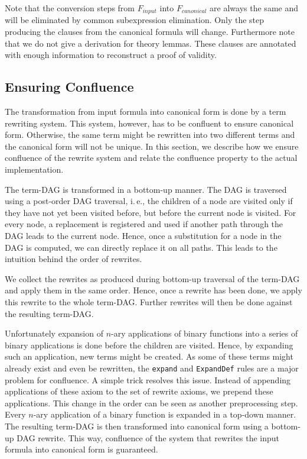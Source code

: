 \documentclass[a4paper]{article}
\begin{document}
Note that the conversion steps from $F_{input}$ into $F_{canonical}$ are always
the same and will be eliminated by common subexpression elimination.  Only the
step producing the clauses from the canonical formula will change.
Furthermore note that we do not give a derivation for theory lemmas.
These clauses are annotated with enough information to reconstruct a proof of
validity.

\subsection{Ensuring Confluence}
The transformation from input formula into canonical form is done by a term
rewriting system.  This system, however, has to be confluent to ensure
canonical form.  Otherwise, the same term might be rewritten into two
different terms and the canonical form will not be unique.  In this section, we
describe how we ensure confluence of the rewrite system and relate the
confluence property to the actual implementation.

The term-DAG is transformed in a bottom-up manner.  The DAG is traversed using
a post-order DAG traversal, i.\,e., the children of a node are visited only if
they have not yet been visited before, but before the current node is visited.
For every node, a replacement is registered and used if another path through
the DAG leads to the current node.  Hence, once a substitution for a node in
the DAG is computed, we can directly replace it on all paths.  This leads to
the intuition behind the order of rewrites.

We collect the rewrites as produced during bottom-up traversal of the term-DAG
and apply them in the same order.  Hence, once a rewrite has been done, we
apply this rewrite to the whole term-DAG.  Further rewrites will then be done
against the resulting term-DAG.

Unfortunately expansion of $n$-ary applications of binary functions into a
series of binary applications is done before the children are visited.  Hence,
by expanding such an application, new terms might be created.  As some of
these terms might already exist and even be rewritten, the \texttt{expand} and
\texttt{ExpandDef} rules are a major problem for confluence.  A simple trick
resolves this issue.  Instead of appending applications of these axiom to the
set of rewrite axioms, we prepend these applications.  This change in the
order can be seen as another preprocessing step.  Every $n$-ary application of
a binary function is expanded in a top-down manner.  The resulting term-DAG is
then transformed into canonical form using a bottom-up DAG rewrite.  This way,
confluence of the system that rewrites the input formula into canonical form
is guaranteed.
\end{document}
